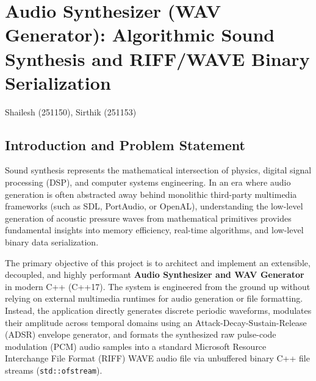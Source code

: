 \documentclass[12pt,a4paper,oneside]{book}
\makeatletter
\newcommand{\chapterauthor}[1]{%
  {\parindent0pt\vspace*{-15pt}%
  \linespread{1.1}\large\itshape\begin{flushright}#1\end{flushright}%
  \par\nobreak\vspace*{25pt}}
  \@afterheading%
}
\makeatother
\begin{document}
\mainmatter


\chapter[Audio Synthesizer (WAV Generator)]{Audio Synthesizer (WAV Generator): Algorithmic Sound Synthesis and RIFF/WAVE Binary Serialization}
\chapterauthor{Shailesh (251150), Sirthik (251153)}

\section{Introduction and Problem Statement}
Sound synthesis represents the mathematical intersection of physics, digital signal processing (DSP), and computer systems engineering. In an era where audio generation is often abstracted away behind monolithic third-party multimedia frameworks (such as SDL, PortAudio, or OpenAL), understanding the low-level generation of acoustic pressure waves from mathematical primitives provides fundamental insights into memory efficiency, real-time algorithms, and low-level binary data serialization.

The primary objective of this project is to architect and implement an extensible, decoupled, and highly performant \textbf{Audio Synthesizer and WAV Generator} in modern C++ (C++17). The system is engineered from the ground up without relying on external multimedia runtimes for audio generation or file formatting. Instead, the application directly generates discrete periodic waveforms, modulates their amplitude across temporal domains using an Attack-Decay-Sustain-Release (ADSR) envelope generator, and formats the synthesized raw pulse-code modulation (PCM) audio samples into a standard Microsoft Resource Interchange File Format (RIFF) WAVE audio file via unbuffered binary C++ file streams (\texttt{std::ofstream}).
\end{document}
